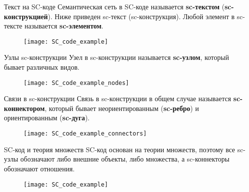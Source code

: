 \begin{frame}{Текст на SC-коде}
  Семантическая сеть в SC-коде называется \textbf{sc-текстом}
  (\textbf{sc-конструкцией}).  Ниже приведен sc-текст
  (sc-конструкция). Любой элемент в sc-тексте называется
  \textbf{sc-элементом}.
  \begin{figure}
    \centering
    \texttt{[image: SC\_code\_example]}
  \end{figure}
\end{frame}

\begin{frame}{Узлы sc-конструкции}
  Узел в sc-конструкции называется \textbf{sc-узлом}, который бывает
  различных видов.
  \begin{figure}
    \centering
    \texttt{[image: SC\_code\_example\_nodes]}
  \end{figure}
\end{frame}

\begin{frame}{Связи в sc-конструкции}
  Связь в sc-конструкции в общем случае называется \textbf{sc-коннектором},
  который бывает неориентированным (\textbf{sc-ребро}) и ориентированным
  (\textbf{sc-дуга}).
  \begin{figure}
    \centering
    \texttt{[image: SC\_code\_example\_connectors]}
  \end{figure}
\end{frame}

\begin{frame}{SC-код и теория множеств}
  SC-код основан на теории множеств, поэтому все sc-узлы обозначают
  либо внешние объекты, либо множества, а sc-коннекторы обозначают
  отношения.
  \begin{figure}
    \centering
    \texttt{[image: SC\_code\_example]}
  \end{figure}
\end{frame}


